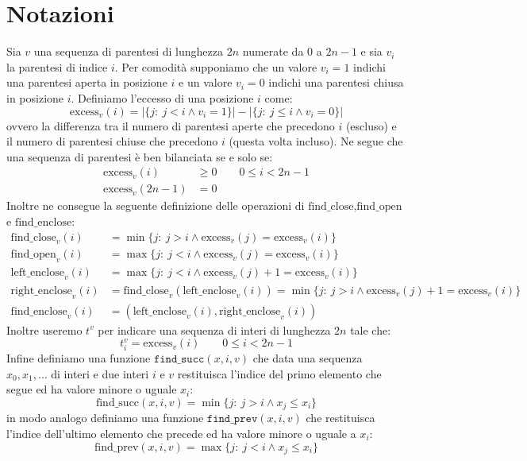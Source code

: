 \documentclass{article}
\begin{document}
\section{Notazioni}
Sia $v$ una sequenza di parentesi di lunghezza $2n$ numerate da $0$ a $2n-1$ e sia $v_i$ la parentesi di indice $i$. Per comodità supponiamo che un valore $v_i=1$ indichi una parentesi aperta in posizione $i$ e un valore $v_i=0$ indichi una parentesi chiusa in posizione $i$. Definiamo l'eccesso di una posizione $i$ come:
    $$
    \text{excess}_v(i) = |\{j :\ j<i \land v_i=1\}|-|\{j :\ j\leq i \land v_i=0\}|
    $$
ovvero la differenza tra il numero di parentesi aperte che precedono $i$ (escluso) e il numero di parentesi chiuse che precedono $i$ (questa volta incluso).
Ne segue che una sequenza di parentesi è ben bilanciata se e solo se:
    \begin{align*}
    \text{excess}_v(i) &\geq 0 \qquad 0\leq i < 2n-1 \\
    \text{excess}_v(2n-1) &= 0
    \end{align*}
Inoltre ne consegue la seguente definizione delle operazioni di $\text{find\_close},\text{find\_open}$ e $\text{find\_enclose}$:
    \begin{align*}
    \text{find\_close}_v(i) &= \min\{j :\ j>i \land \text{excess}_v(j)=\text{excess}_v(i)\} \\
    \text{find\_open}_v(i) &= \max\{j :\ j<i \land \text{excess}_v(j)=\text{excess}_v(i)\} \\
    \text{left\_enclose}_v(i) &= \max\{j :\ j<i \land \text{excess}_v(j)+1=\text{excess}_v(i)\} \\
    \text{right\_enclose}_v(i) &= \text{find\_close}_v(\text{left\_enclose}_v(i)) = \min\{j :\ j>i \land \text{excess}_v(j)+1=\text{excess}_v(i)\} \\
    \text{find\_enclose}_v(i) &= (\text{left\_enclose}_v(i),\text{right\_enclose}_v(i))
    \end{align*}
Inoltre useremo $t^v$ per indicare una sequenza di interi di lunghezza $2n$ tale che:
    $$
    t^v_i=\text{excess}_v(i) \qquad 0\leq i < 2n-1
    $$
Infine definiamo una funzione $\texttt{find\_succ}(x,i,v)$ che data una sequenza $x_0,x_1,\dots$ di interi e due interi $i$ e $v$ restituisca l'indice del primo elemento che segue ed ha valore minore o uguale $x_i$:
    $$
    \text{find\_succ}(x,i,v)=\min\{j :\ j>i \land x_j\leq x_i\}
    $$
in modo analogo definiamo una funzione $\texttt{find\_prev}(x,i,v)$ che restituisca l'indice dell'ultimo elemento che precede ed ha valore minore o uguale a $x_i$:
    $$
    \text{find\_prev}(x,i,v)=\max\{j :\ j<i \land x_j\leq x_i\}
    $$
\end{document}

